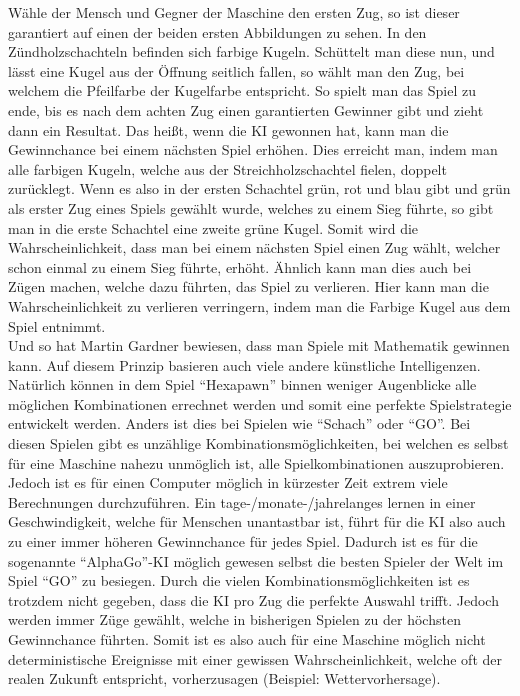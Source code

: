 Wähle der Mensch und Gegner der Maschine den ersten Zug, so ist dieser garantiert auf einen der beiden ersten Abbildungen zu sehen. In den Zündholzschachteln befinden sich farbige Kugeln. Schüttelt man diese nun, und lässt eine Kugel aus der Öffnung seitlich fallen, so wählt man den Zug, bei welchem die Pfeilfarbe der Kugelfarbe entspricht. So spielt man das Spiel zu ende, bis es nach dem achten Zug einen garantierten Gewinner gibt und zieht dann ein Resultat. Das heißt, wenn die KI gewonnen hat, kann man die Gewinnchance bei einem nächsten Spiel erhöhen. Dies erreicht man, indem man alle farbigen Kugeln, welche aus der Streichholzschachtel fielen, doppelt zurücklegt. Wenn es also in der ersten Schachtel grün, rot und blau gibt und grün als erster Zug eines Spiels gewählt wurde, welches zu einem Sieg führte, so gibt man in die erste Schachtel eine zweite grüne Kugel. Somit wird die Wahrscheinlichkeit, dass man bei einem nächsten Spiel einen Zug wählt, welcher schon einmal zu einem Sieg führte, erhöht. Ähnlich kann man dies auch bei Zügen machen, welche dazu führten, das Spiel zu verlieren. Hier kann man die Wahrscheinlichkeit zu verlieren verringern, indem man die Farbige Kugel aus dem Spiel entnimmt.
\\
Und so hat Martin Gardner bewiesen, dass man Spiele mit Mathematik gewinnen kann. Auf diesem Prinzip basieren auch viele andere künstliche Intelligenzen. Natürlich können in dem Spiel ``Hexapawn'' binnen weniger Augenblicke alle möglichen Kombinationen errechnet werden und somit eine perfekte Spielstrategie entwickelt werden. Anders ist dies bei Spielen wie ``Schach'' oder ``GO''. Bei diesen Spielen gibt es unzählige Kombinationsmöglichkeiten, bei welchen es selbst für eine Maschine nahezu unmöglich ist, alle Spielkombinationen auszuprobieren. Jedoch ist es für einen Computer möglich in kürzester Zeit extrem viele Berechnungen durchzuführen. Ein tage-/monate-/jahrelanges lernen in einer Geschwindigkeit, welche für Menschen unantastbar ist, führt für die KI also auch zu einer immer höheren Gewinnchance für jedes Spiel. Dadurch ist es für die sogenannte ``AlphaGo''-KI möglich gewesen selbst die besten Spieler der Welt im Spiel ``GO'' zu besiegen. Durch die vielen Kombinationsmöglichkeiten ist es trotzdem nicht gegeben, dass die KI pro Zug die perfekte Auswahl trifft. Jedoch werden immer Züge gewählt, welche in bisherigen Spielen zu der höchsten Gewinnchance führten. Somit ist es also auch für eine Maschine möglich nicht deterministische Ereignisse mit einer gewissen Wahrscheinlichkeit, welche oft der realen Zukunft entspricht, vorherzusagen (Beispiel: Wettervorhersage).

